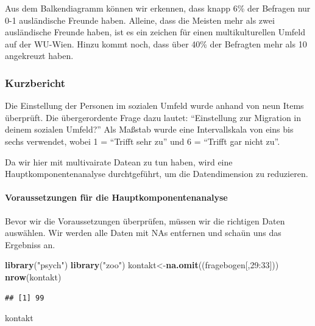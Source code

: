 \documentclass[]{article}
\newenvironment{Shaded}{\begin{snugshade}}{\end{snugshade}}
\newcommand{\KeywordTok}[1]{\textcolor[rgb]{0.13,0.29,0.53}{\textbf{{#1}}}}
\newcommand{\DecValTok}[1]{\textcolor[rgb]{0.00,0.00,0.81}{{#1}}}
\newcommand{\StringTok}[1]{\textcolor[rgb]{0.31,0.60,0.02}{{#1}}}
\newcommand{\NormalTok}[1]{{#1}}
\let\oldparagraph\paragraph
\renewcommand{\paragraph}[1]{\oldparagraph{#1}\mbox{}}
\begin{document}
Aus dem Balkendiagramm können wir erkennen, dass knapp 6\% der Befragen
nur 0-1 ausländische Freunde haben. Alleine, dass die Meisten mehr als
zwei ausländische Freunde haben, ist es ein zeichen für einen
multikulturellen Umfeld auf der WU-Wien. Hinzu kommt noch, dass über
40\% der Befragten mehr als 10 angekreuzt haben.

\subsubsection{Kurzbericht}\label{kurzbericht-2}

Die Einstellung der Personen im sozialen Umfeld wurde anhand von neun
Items überprüft. Die übergerordente Frage dazu lautet: ``Einstellung zur
Migration in deinem sozialen Umfeld?'' Als Maßstab wurde eine
Intervallskala von eins bis sechs verwendet, wobei 1 = ``Trifft sehr
zu'' und 6 = ``Trifft gar nicht zu''.

Da wir hier mit multivairate Datean zu tun haben, wird eine
Hauptkomponentenanalyse durchtgeführt, um die Datendimension zu
reduzieren.

\paragraph{Voraussetzungen für die
Hauptkomponentenanalyse}\label{voraussetzungen-fur-die-hauptkomponentenanalyse-1}

Bevor wir die Voraussetzungen überprüfen, müssen wir die richtigen Daten
auswählen. Wir werden alle Daten mit NAs entfernen und schaün uns das
Ergebniss an.

\begin{Shaded}
\begin{Highlighting}[]
\KeywordTok{library}\NormalTok{(}\StringTok{"psych"}\NormalTok{)}
\KeywordTok{library}\NormalTok{(}\StringTok{"zoo"}\NormalTok{)}
\NormalTok{kontakt<-}\KeywordTok{na.omit}\NormalTok{((fragebogen[,}\DecValTok{29}\NormalTok{:}\DecValTok{33}\NormalTok{]))}
\KeywordTok{nrow}\NormalTok{(kontakt)}
\end{Highlighting}
\end{Shaded}

\begin{verbatim}
## [1] 99
\end{verbatim}

\begin{Shaded}
\begin{Highlighting}[]
\NormalTok{kontakt}
\end{Highlighting}
\end{Shaded}
\end{document}

